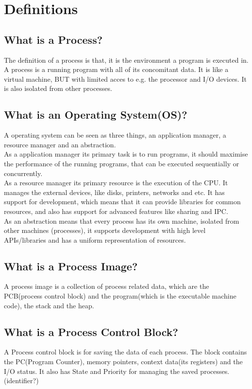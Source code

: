 \documentclass{report}
\begin{document}
\chapter{Definitions}
\section{What is a Process?}
The definition of a process is that, it is the environment a program is executed in. A process is a running program with all of its concomitant data. It is like a virtual machine, BUT with limited acces to e.g. the processor and I/O devices. It is also isolated from other processes.

\section{What is an Operating System(OS)?}
A operating system can be seen as three things, an application manager, a resource manager and an abstraction. 
\\
As a application manager its primary task is to run programs, it should maximise the performance of the running programs, that can be executed sequentially or concurrently.
\\
As a resource manager its primary resource is the execution of the CPU. It manages the external devices, like disks, printers, networks and etc. It has support for development, which means that it can provide libraries for common resources, and also has support for advanced features like sharing and IPC.
\\
As an abstraction means that every process has its own machine, isolated from other machines (processes), it supports development with high level APIs/libraries and has a uniform representation of resources.

\section{What is a Process Image?}
A process image is a collection of process related data, which are the PCB(process control block) and the program(which is the executable machine code), the stack and the heap.

\section{What is a Process Control Block?}
A Process control block is for saving the data of each process. The block contains the PC(Program Counter), memory pointers, context data(its registers) and the I/O status. It also has State and Priority for managing the saved processes.(identifier?)
\end{document}

